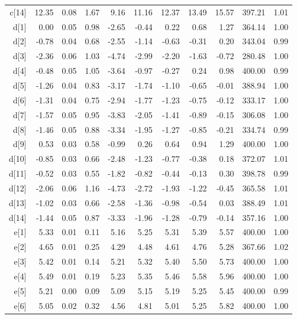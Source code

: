 \begin{longtable}{rrrrrrrrrrr}
  c[14] & 12.35 & 0.08 & 1.67 & 9.16 & 11.16 & 12.37 & 13.49 & 15.57 & 397.21 & 1.01 \\ 
  d[1] & 0.00 & 0.05 & 0.98 & -2.65 & -0.44 & 0.22 & 0.68 & 1.27 & 364.14 & 1.00 \\ 
  d[2] & -0.78 & 0.04 & 0.68 & -2.55 & -1.14 & -0.63 & -0.31 & 0.20 & 343.04 & 0.99 \\ 
  d[3] & -2.36 & 0.06 & 1.03 & -4.74 & -2.99 & -2.20 & -1.63 & -0.72 & 280.48 & 1.00 \\ 
  d[4] & -0.48 & 0.05 & 1.05 & -3.64 & -0.97 & -0.27 & 0.24 & 0.98 & 400.00 & 0.99 \\ 
  d[5] & -1.26 & 0.04 & 0.83 & -3.17 & -1.74 & -1.10 & -0.65 & -0.01 & 388.94 & 1.00 \\ 
  d[6] & -1.31 & 0.04 & 0.75 & -2.94 & -1.77 & -1.23 & -0.75 & -0.12 & 333.17 & 1.00 \\ 
  d[7] & -1.57 & 0.05 & 0.95 & -3.83 & -2.05 & -1.41 & -0.89 & -0.15 & 306.08 & 1.00 \\ 
  d[8] & -1.46 & 0.05 & 0.88 & -3.34 & -1.95 & -1.27 & -0.85 & -0.21 & 334.74 & 0.99 \\ 
  d[9] & 0.53 & 0.03 & 0.58 & -0.99 & 0.26 & 0.64 & 0.94 & 1.29 & 400.00 & 1.00 \\ 
  d[10] & -0.85 & 0.03 & 0.66 & -2.48 & -1.23 & -0.77 & -0.38 & 0.18 & 372.07 & 1.01 \\ 
  d[11] & -0.52 & 0.03 & 0.55 & -1.82 & -0.82 & -0.44 & -0.13 & 0.30 & 398.78 & 0.99 \\ 
  d[12] & -2.06 & 0.06 & 1.16 & -4.73 & -2.72 & -1.93 & -1.22 & -0.45 & 365.58 & 1.01 \\ 
  d[13] & -1.02 & 0.03 & 0.66 & -2.58 & -1.36 & -0.98 & -0.54 & 0.03 & 388.49 & 1.01 \\ 
  d[14] & -1.44 & 0.05 & 0.87 & -3.33 & -1.96 & -1.28 & -0.79 & -0.14 & 357.16 & 1.00 \\ 
  e[1] & 5.33 & 0.01 & 0.11 & 5.16 & 5.25 & 5.31 & 5.39 & 5.57 & 400.00 & 1.00 \\ 
  e[2] & 4.65 & 0.01 & 0.25 & 4.29 & 4.48 & 4.61 & 4.76 & 5.28 & 367.66 & 1.02 \\ 
  e[3] & 5.42 & 0.01 & 0.14 & 5.21 & 5.32 & 5.40 & 5.50 & 5.73 & 400.00 & 1.00 \\ 
  e[4] & 5.49 & 0.01 & 0.19 & 5.23 & 5.35 & 5.46 & 5.58 & 5.96 & 400.00 & 1.00 \\ 
  e[5] & 5.21 & 0.00 & 0.09 & 5.09 & 5.15 & 5.19 & 5.25 & 5.45 & 400.00 & 0.99 \\ 
  e[6] & 5.05 & 0.02 & 0.32 & 4.56 & 4.81 & 5.01 & 5.25 & 5.82 & 400.00 & 1.00 \\ 

\end{longtable}
